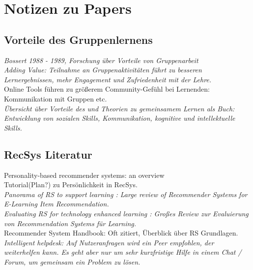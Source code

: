 \documentclass[nochapterpage,bigchapter,linedtoc,longdoc,colorback,accentcolor=tud3b,oneside]{tudreport}
\begin{document}
\chapter{Notizen zu Papers}

\section{Vorteile des Gruppenlernens}
\textit{Bossert 1988 - 1989, Forschung über Vorteile von Gruppenarbeit \cite{bossert1982instructional}}\\

\textit{Adding Value: Teilnahme an Gruppenaktivitäten führt zu besseren Lernergebnissen, mehr Engagement und Zufriedenheit mit der Lehre. \cite{zhao2004adding}}\\

Online Tools führen zu größerem Community-Gefühl bei Lernenden: Kommunikation mit Gruppen etc. \cite{dawson2006study}\\

\textit{Übersicht über Vorteile des und Theorien zu gemeinsamem Lernen als Buch: \cite{maxwell2008learning} Entwicklung von sozialen Skills, Kommunikation, kognitive und intellektuelle Skills.}

\section{RecSys Literatur}
Personality-based recommender systems: an overview \cite{nunes2012personality}\\
Tutorial(Plan?) zu Persönlichkeit in RecSys.\\

\textit{Panorama of RS to support learning \cite{drachsler2015panorama}: Large review of Recommender Systems for E-Learning Item Recommendation.}\\

\textit{Evaluating RS for technology enhanced learning \cite{erdt2015evaluating}: Großes Review zur Evaluierung von Recommendation Systems für Learning.}\\

Recommender System Handbook: \cite{ricci2011introduction} Oft zitiert, Überblick über RS Grundlagen.\\

\textit{Intelligent helpdesk: Auf Nutzeranfragen wird ein Peer empfohlen, der weiterhelfen kann. Es geht aber nur um sehr kurzfristige Hilfe in einem Chat / Forum, um gemeinsam ein Problem zu lösen. \cite{greer1998intelligent}}\\
\end{document}
